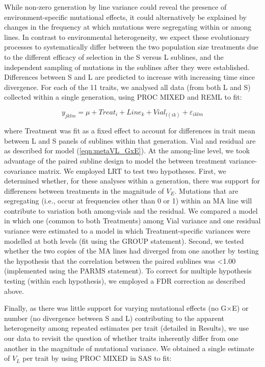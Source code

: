 While non-zero generation by line variance could reveal the presence of environment-specific mutational effects, it could alternatively be explained by changes in the frequency at which mutations were segregating within or among lines. In contrast to environmental heterogeneity, we expect these evolutionary processes to systematically differ between the two population size treatments due to the different efficacy of selection in the S versus L sublines, and the independent sampling of mutations in the sublines after they were established. Differences between S and L are predicted to increase with increasing time since divergence. For each of the 11 traits, we analysed all data (from both L and S) collected within a single generation, using PROC MIXED and REML to fit: \par

\begin{equation}
\label{eqn:metaTreat}
y_{jklm} =\mu + Treat_i + Line_k + Vial_{l(ik)} + \varepsilon_{iklm}
\end{equation}

\noindent where Treatment was fit as a fixed effect to account for differences in trait mean between L and S panels of sublines within that generation. Vial and residual are as described for model (\ref{eqn:metaVL_GxE}). At the among-line level, we took advantage of the paired subline design to model the between treatment variance-covariance matrix. We employed LRT to test two hypotheses. First, we determined whether, for these analyses within a generation, there was support for differences between treatments in the magnitude of $V_E$. Mutations that are segregating (i.e., occur at frequencies other than 0 or 1) within an MA line will contribute to variation both among-vials and the residual. We compared a model in which one (common to both Treatments) among Vial variance and one residual variance were estimated to a model in which Treatment-specific variances were modelled at both levels (fit using the GROUP statement). Second, we tested whether the two copies of the MA lines had diverged from one another by testing the hypothesis that the correlation between the paired sublines was <1.00 (implemented using the PARMS statement). To correct for multiple hypothesis testing (within each hypothesis), we employed a FDR correction as described above. \par

Finally, as there was little support for varying mutational effects (no G$\times$E) or number (no divergence between S and L) contributing to the apparent heterogeneity among repeated estimates per trait (detailed in Results), we use our data to revisit the question of whether traits inherently differ from one another in the magnitude of mutational variance. We obtained a single estimate of $V_L$ per trait by using PROC MIXED in SAS to fit: \par

